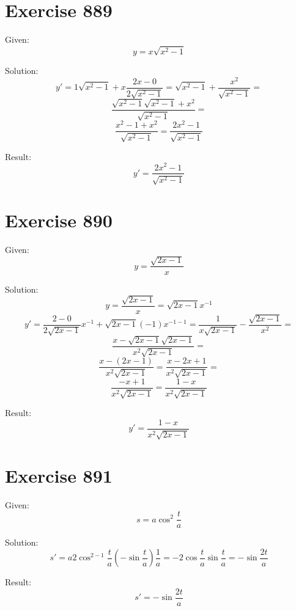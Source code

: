 \documentclass[a4paper, 10pt]{scrartcl}
\begin{document}
\section{Exercise 889}

Given:
\[
y = x\sqrt{x^{2} - 1}
\]

Solution:
\[
y' = 1\sqrt{x^{2} - 1} + x\frac{2x - 0}{2\sqrt{x^{2} - 1}} = \sqrt{x^{2} - 1} + \frac{x^{2}}{\sqrt{x^{2} - 1}} =
\]
\[
\frac{\sqrt{x^{2} - 1}\sqrt{x^{2} - 1} + x^{2}}{\sqrt{x^{2} - 1}} =
\]
\[
\frac{x^{2} - 1 + x^{2}}{\sqrt{x^{2} - 1}} = \frac{2x^{2} - 1}{\sqrt{x^{2} - 1}}
\]

Result:
\[
y' = \frac{2x^{2} - 1}{\sqrt{x^{2} - 1}}
\]

\section{Exercise 890}

Given:
\[
y = \frac{\sqrt{2x - 1}}{x}
\]

Solution:
\[
y = \frac{\sqrt{2x - 1}}{x} = \sqrt{2x - 1}x^{-1}
\]
\[
y' = \frac{2 - 0}{2\sqrt{2x - 1}}x^{-1} + \sqrt{2x - 1}(-1)x^{-1 - 1} = \frac{1}{x\sqrt{2x - 1}} - \frac{\sqrt{2x - 1}}{x^{2}} =
\]
\[
\frac{x - \sqrt{2x - 1}\sqrt{2x - 1}}{x^{2}\sqrt{2x - 1}} =
\]
\[
\frac{x - (2x - 1)}{x^{2}\sqrt{2x - 1}} = \frac{x - 2x + 1}{x^{2}\sqrt{2x - 1}} =
\]
\[
\frac{-x + 1}{x^{2}\sqrt{2x - 1}} = \frac{1 - x}{x^{2}\sqrt{2x - 1}}
\]

Result:
\[
y' = \frac{1 - x}{x^{2}\sqrt{2x - 1}}
\]

\section{Exercise 891}

Given:
\[
s = a\cos^{2}{\frac{t}{a}}
\]

Solution:
\[
s' = a2\cos^{2 - 1}{\frac{t}{a}}(-\sin{\frac{t}{a}})\frac{1}{a} = -2\cos{\frac{t}{a}}\sin{\frac{t}{a}} = -\sin{\frac{2t}{a}}
\]

Result:
\[
s' = -\sin{\frac{2t}{a}}
\]
\end{document}
